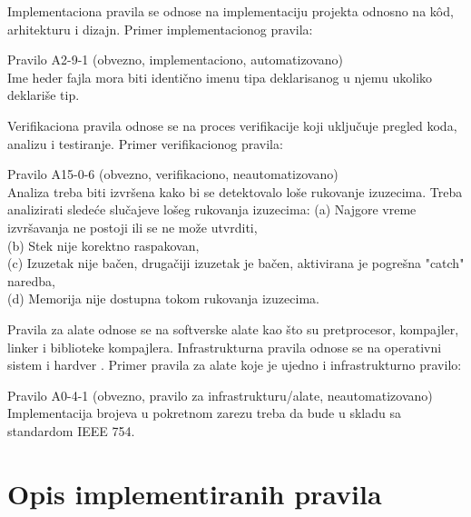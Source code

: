 \documentclass[12pt,oneside]{memoir}
\begin{document}
\begin{itemize}
{Implementaciona pravila se odnose na implementaciju projekta odnosno na k\^{o}d, arhitekturu i dizajn.
Primer implementacionog pravila:

\begin{center}
\begin{tcolorbox}
Pravilo A2-9-1 (obvezno, implementaciono, automatizovano) \\
Ime heder fajla mora biti identično imenu tipa deklarisanog u njemu ukoliko deklariše tip.
\end{tcolorbox}
\end{center}


Verifikaciona pravila odnose se na proces verifikacije koji uključuje pregled koda, analizu i testiranje.
Primer verifikacionog pravila:

\begin{center}
\begin{tcolorbox}
Pravilo A15-0-6 (obvezno, verifikaciono, neautomatizovano) \\
Analiza treba biti izvršena kako bi se detektovalo loše rukovanje izuzecima. Treba analizirati slede\'ce slučajeve lošeg rukovanja izuzecima:
(a) Najgore vreme izvršavanja ne postoji ili se ne može utvrditi, \\
(b) Stek nije korektno raspakovan, \\
(c) Izuzetak nije bačen, drugačiji izuzetak je bačen, aktivirana je pogre\v{s}na "catch" naredba, \\
(d) Memorija nije dostupna tokom rukovanja izuzecima.
\end{tcolorbox}
\end{center}

Pravila za alate odnose se na softverske alate kao što su pretprocesor, kompajler, linker i biblioteke kompajlera.
Infrastrukturna pravila odnose se na operativni sistem i hardver \cite{AutosarGuidelines}.
Primer pravila za alate koje je ujedno i infrastrukturno pravilo:

\begin{center}
\begin{tcolorbox}
Pravilo A0-4-1 (obvezno, pravilo za infrastrukturu/alate, neautomatizovano) \\
Implementacija brojeva u pokretnom zarezu treba da bude u skladu sa standardom IEEE 754.
\end{tcolorbox}
\end{center}

}
\end{itemize}

\section{Opis implementiranih pravila}
\end{document}
